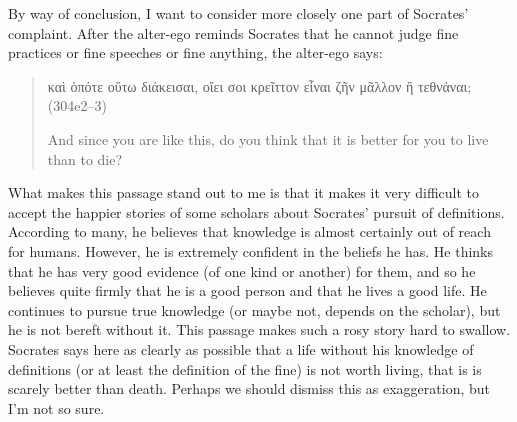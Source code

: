 \documentclass[11pt]{article}
\begin{document}
By way of conclusion, I want to consider more closely one part of Socrates'
complaint.  After the alter-ego reminds Socrates that he cannot judge fine
practices or fine speeches or fine anything, the alter-ego says:

\begin{quote}

    {\g καὶ ὁπότε οὕτω διάκεισαι, οἴει σοι κρεῖττον εἶναι ζῆν μᾶλλον
    ἢ τεθνάναι;} (304e2--3)

    And since you are like this, do you think that it is better for you to live
    than to die?

\end{quote}

What makes this passage stand out to me is that it makes it very difficult to
accept the happier stories of some scholars about Socrates' pursuit of
definitions.  According to many, he believes that knowledge is almost certainly
out of reach for humans.  However, he is extremely confident in the beliefs he
has.  He thinks that he has very good evidence (of one kind or another) for
them, and so he believes quite firmly that he is a good person and that he
lives a good life.  He continues to pursue true knowledge (or maybe not,
depends on the scholar), but he is not bereft without it.  This passage makes
such a rosy story hard to swallow.  Socrates says here as clearly as possible
that a life without his knowledge of definitions (or at least the definition of
the fine) is not worth living, that is is scarely better than death.  Perhaps
we should dismiss this as exaggeration, but I'm not so sure.



\newpage


\end{document}
